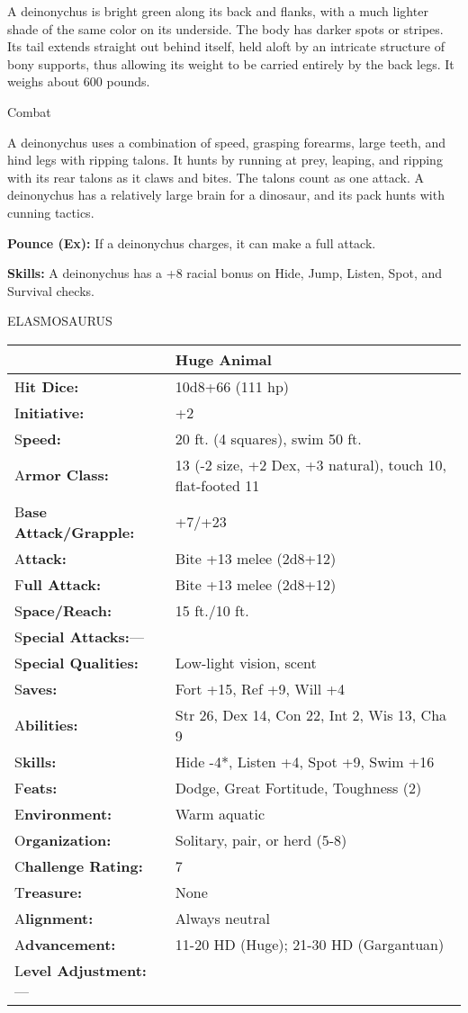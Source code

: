 \documentclass{article}
\begin{document}
A deinonychus is bright green along its back and flanks, with a much lighter shade 
of the same color on its underside. The body has darker spots or stripes. Its tail 
extends straight out behind itself, held aloft by an intricate structure of bony 
supports, thus allowing its weight to be carried entirely by the back legs. It 
weighs about 600 pounds.

Combat

A deinonychus uses a combination of speed, grasping forearms, large teeth, and 
hind legs with ripping talons. It hunts by running at prey, leaping, and ripping 
with its rear talons as it claws and bites. The talons count as one attack. A deinonychus 
has a relatively large brain for a dinosaur, and its pack hunts with cunning tactics.

\textbf{Pounce (Ex):} If a deinonychus charges, it can make a full attack.

\textbf{Skills:} A deinonychus has a +8 racial bonus on Hide, Jump, Listen, Spot, 
and Survival checks.

\vspace{12pt}
ELASMOSAURUS

\begin{tabular}{|>{\raggedright}p{91pt}|>{\raggedright}p{226pt}|}
\hline
  & Huge Animal\tabularnewline
\hline
H\textbf{it Dice:} & 10d8+66 (111 hp)\tabularnewline
\hline
I\textbf{nitiative:} & +2\tabularnewline
\hline
S\textbf{peed:} & 20 ft. (4 squares), swim 50 ft.\tabularnewline
\hline
A\textbf{rmor Class:} & 13 (-2 size, +2 Dex, +3 natural), touch 10, flat-footed 
11\tabularnewline
\hline
B\textbf{ase Attack/Grapple:} & +7/+23\tabularnewline
\hline
A\textbf{ttack:} & Bite +13 melee (2d8+12)\tabularnewline
\hline
F\textbf{ull Attack:} & Bite +13 melee (2d8+12)\tabularnewline
\hline
S\textbf{pace/Reach:} & 15 ft./10 ft.\tabularnewline
\hline
S\textbf{pecial Attacks:}--- & \tabularnewline
\hline
S\textbf{pecial Qualities:} & Low-light vision, scent\tabularnewline
\hline
S\textbf{aves:} & Fort +15, Ref +9, Will +4\tabularnewline
\hline
A\textbf{bilities:} & Str 26, Dex 14, Con 22, Int 2, Wis 13, Cha 9\tabularnewline
\hline
S\textbf{kills:} & Hide -4*, Listen +4, Spot +9, Swim +16\tabularnewline
\hline
F\textbf{eats:} & Dodge, Great Fortitude, Toughness (2)\tabularnewline
\hline
E\textbf{nvironment:} & Warm aquatic\tabularnewline
\hline
O\textbf{rganization:} & Solitary, pair, or herd (5-8)\tabularnewline
\hline
C\textbf{hallenge Rating:} & 7\tabularnewline
\hline
T\textbf{reasure:} & None\tabularnewline
\hline
A\textbf{lignment:} & Always neutral\tabularnewline
\hline
A\textbf{dvancement:} & 11-20 HD (Huge); 21-30 HD (Gargantuan)\tabularnewline
\hline
L\textbf{evel Adjustment:}--- & \tabularnewline
\hline
\end{tabular}
\end{document}
